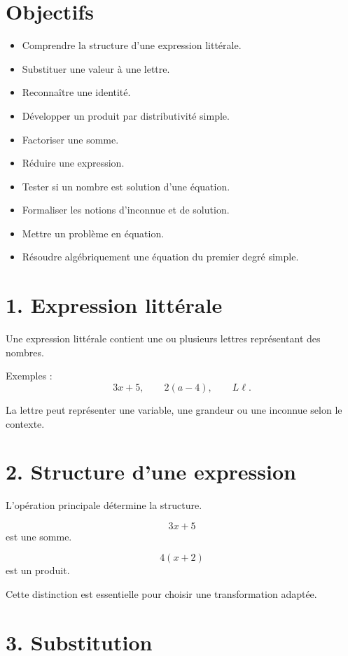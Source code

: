 
\section{Objectifs}

\begin{itemize}
\item Comprendre la structure d'une expression littérale.
\item Substituer une valeur à une lettre.
\item Reconnaître une identité.
\item Développer un produit par distributivité simple.
\item Factoriser une somme.
\item Réduire une expression.
\item Tester si un nombre est solution d'une équation.
\item Formaliser les notions d'inconnue et de solution.
\item Mettre un problème en équation.
\item Résoudre algébriquement une équation du premier degré simple.
\end{itemize}

\section{1. Expression littérale}

Une expression littérale contient une ou plusieurs lettres représentant des nombres.

Exemples :
\[
3x+5,\qquad 2(a-4),\qquad L\ell.
\]

La lettre peut représenter une variable, une grandeur ou une inconnue selon le contexte.

\section{2. Structure d'une expression}

L'opération principale détermine la structure.

\[
3x+5
\]
est une somme.

\[
4(x+2)
\]
est un produit.

Cette distinction est essentielle pour choisir une transformation adaptée.

\section{3. Substitution}

